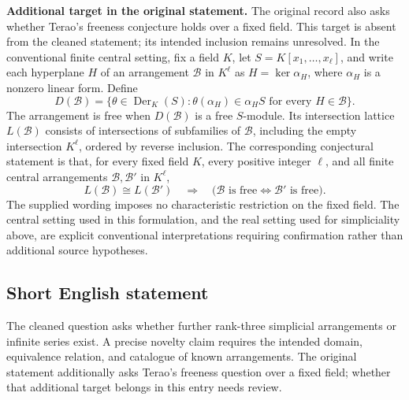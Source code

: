 \documentclass[11pt]{article}
\begin{document}
\textbf{Additional target in the original statement.} The original record also asks whether Terao's freeness conjecture holds over a fixed field. This target is absent from the cleaned statement; its intended inclusion remains unresolved. In the conventional finite central setting, fix a field \(K\), let \(S=K[x_1,\ldots,x_\ell]\), and write each hyperplane \(H\) of an arrangement \(\mathcal B\) in \(K^\ell\) as \(H=\ker\alpha_H\), where \(\alpha_H\) is a nonzero linear form. Define
\[
D(\mathcal B)=\{\theta\in\operatorname{Der}_K(S):\theta(\alpha_H)\in\alpha_H S\text{ for every }H\in\mathcal B\}.
\]
The arrangement is free when \(D(\mathcal B)\) is a free \(S\)-module. Its intersection lattice \(L(\mathcal B)\) consists of intersections of subfamilies of \(\mathcal B\), including the empty intersection \(K^\ell\), ordered by reverse inclusion. The corresponding conjectural statement is that, for every fixed field \(K\), every positive integer \(\ell\), and all finite central arrangements \(\mathcal B,\mathcal B'\) in \(K^\ell\),
\[
L(\mathcal B)\cong L(\mathcal B')
\quad\Longrightarrow\quad
\bigl(\mathcal B\text{ is free}\iff\mathcal B'\text{ is free}\bigr).
\]
The supplied wording imposes no characteristic restriction on the fixed field. The central setting used in this formulation, and the real setting used for simpliciality above, are explicit conventional interpretations requiring confirmation rather than additional source hypotheses.
\subsection{Short English statement}
The cleaned question asks whether further rank-three simplicial arrangements or infinite series exist. A precise novelty claim requires the intended domain, equivalence relation, and catalogue of known arrangements. The original statement additionally asks Terao's freeness question over a fixed field; whether that additional target belongs in this entry needs review.
\end{document}
